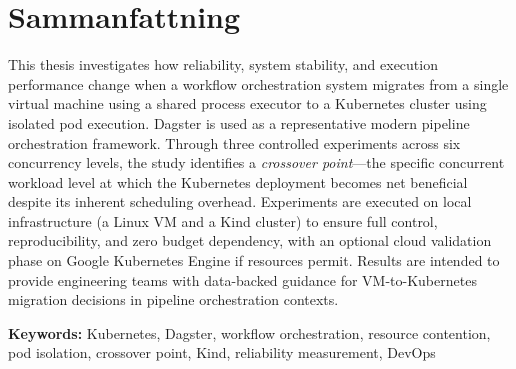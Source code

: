 
\chapter*{Sammanfattning}


This thesis investigates how reliability, system stability, and execution performance change when a workflow orchestration system migrates from a single virtual machine using a shared process executor to a Kubernetes cluster using isolated pod execution. Dagster is used as a representative modern pipeline orchestration framework. Through three controlled experiments across six concurrency levels, the study identifies a \emph{crossover point}---the specific concurrent workload level at which the Kubernetes deployment becomes net beneficial despite its inherent scheduling overhead. Experiments are executed on local infrastructure (a Linux VM and a Kind cluster) to ensure full control, reproducibility, and zero budget dependency, with an optional cloud validation phase on Google Kubernetes Engine if resources permit. Results are intended to provide engineering teams with data-backed guidance for VM-to-Kubernetes migration decisions in pipeline orchestration contexts.

\vspace{1em}
\noindent\textbf{Keywords:} Kubernetes, Dagster, workflow orchestration, resource contention, pod isolation, crossover point, Kind, reliability measurement, DevOps

\clearpage
